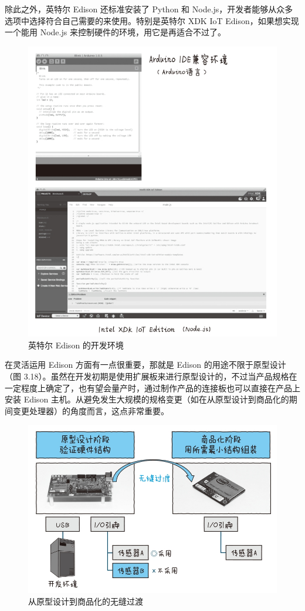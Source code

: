 \documentclass[12pt,UTF8]{ctexbook}
\begin{document}
除此之外，英特尔 Edison 还标准安装了 Python 和 Node.js，开发者能够从众多选项中选择符合自己需要的来使用。特别是英特尔 XDK IoT Edison，如果想实现一个能用 Node.js 来控制硬件的环境，用它是再适合不过了。

\begin{figure}[htbp]
	\centering
	\includegraphics[width=1\linewidth]{68}
	\caption{英特尔 Edison 的开发环境}
	\label{fig:1}
\end{figure}

在灵活运用 Edison 方面有一点很重要，那就是 Edison 的用途不限于原型设计（图 3.18）。虽然在开发初期是使用扩展板来进行原型设计的，不过当产品规格在一定程度上确定了，也有望会量产时，通过制作产品的连接板也可以直接在产品上安装 Edison 主机。从避免发生大规模的规格变更（如在从原型设计到商品化的期间变更处理器）的角度而言，这点非常重要。

\begin{figure}[htbp]
	\centering
	\includegraphics[width=1\linewidth]{69}
	\caption{从原型设计到商品化的无缝过渡}
	\label{fig:1}
\end{figure}
\end{document}
